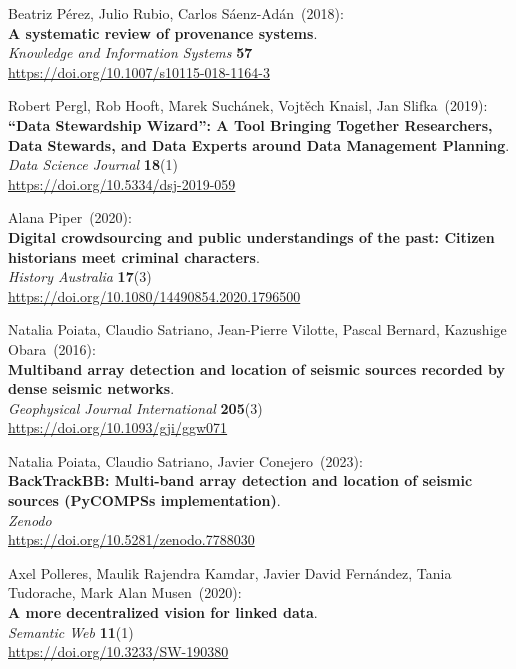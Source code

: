 \begin{thebibliography}{9}
Beatriz Pérez, Julio Rubio, Carlos Sáenz-Adán~(2018): \\
\textbf{A systematic review of provenance systems}.\\
\emph{Knowledge and Information Systems} \textbf{57}\\
\url{https://doi.org/10.1007/s10115-018-1164-3} 

Robert Pergl, Rob Hooft, Marek Suchánek, Vojtěch Knaisl, Jan Slifka~(2019): \\
\textbf{``Data Stewardship Wizard'': A Tool Bringing Together Researchers, Data Stewards, and Data Experts around Data Management Planning}.\\
\emph{Data Science Journal} \textbf{18}(1)\\
\url{https://doi.org/10.5334/dsj-2019-059}

Alana Piper~(2020): \\
\textbf{Digital crowdsourcing and public understandings of the past: Citizen historians meet criminal characters}.\\
\emph{History Australia} \textbf{17}(3) \\
\url{https://doi.org/10.1080/14490854.2020.1796500}

Natalia Poiata, Claudio Satriano, Jean-Pierre Vilotte, Pascal Bernard, Kazushige Obara~(2016): \\
\textbf{Multiband array detection and location of seismic sources recorded by dense seismic networks}.\\
\emph{Geophysical Journal International} \textbf{205}(3)\\
\url{https://doi.org/10.1093/gji/ggw071}

Natalia Poiata, Claudio Satriano, Javier Conejero~(2023): \\
\textbf{BackTrackBB: Multi-band array detection and location of seismic sources (PyCOMPSs implementation)}.\\
\emph{Zenodo}\\
\url{https://doi.org/10.5281/zenodo.7788030}


Axel Polleres, Maulik Rajendra Kamdar, Javier David Fernández, Tania Tudorache, Mark Alan Musen~(2020): \\
\textbf{A more decentralized vision for linked data}.\\ 
\emph{Semantic Web} \textbf{11}(1) \\
\url{https://doi.org/10.3233/SW-190380}


\end{thebibliography}
